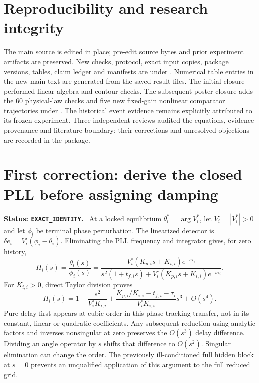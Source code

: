 \documentclass[11pt]{article}
\newcommand{\status}[1]{\par\smallskip\noindent\textbf{Status: \texttt{#1}.}\ }
\begin{document}
\section*{Reproducibility and research integrity}
The main source is edited in place; pre-edit source bytes and prior
experiment artifacts are preserved. New checks, protocol, exact
input copies, package versions, tables, claim ledger and manifests
are under .
Numerical table entries in the new main text are generated from
the saved result files. The initial closure performed linear-algebra
and contour checks. The subsequent poster closure adds the 60 physical-law
checks and five new fixed-gain nonlinear comparator trajectories under
.
The historical event evidence remains explicitly attributed to its
frozen experiment. Three independent reviews audited the equations,
evidence provenance and literature boundary; their corrections and
unresolved objections are recorded in the package.

\clearpage
\appendix
\section{First correction: derive the closed PLL before assigning damping}
\status{EXACT\_IDENTITY}
At a locked equilibrium $\theta_i^*=\arg V_i^*$, let
$V_i^\circ=|V_i^*|>0$ and let $\phi_i$ be terminal phase perturbation.
The linearized detector is $\delta e_i=V_i^\circ(\phi_i-\theta_i)$.
Eliminating the PLL frequency and integrator gives, for zero history,
\begin{equation}
 H_i(s)=\frac{\theta_i(s)}{\phi_i(s)}
 =\frac{V_i^\circ(K_{p,i}s+K_{i,i})e^{-s\tau_i}}
 {s^2(1+t_{f,i}s)+V_i^\circ(K_{p,i}s+K_{i,i})e^{-s\tau_i}}. \label{eq:H}
\end{equation}
For $K_{i,i}>0$, direct Taylor division proves
\begin{equation}
 H_i(s)=1-\frac{s^2}{V_i^\circ K_{i,i}}
 +\frac{K_{p,i}/K_{i,i}-t_{f,i}-\tau_i}{V_i^\circ K_{i,i}}s^3+O(s^4).
 \label{eq:series}
\end{equation}
Pure delay first appears at cubic order in this phase-tracking transfer,
not in its constant, linear or quadratic coefficients.
Any subsequent reduction using analytic factors and inverses nonsingular
at zero preserves the $O(s^3)$ delay difference. Dividing an angle
operator by $s$ shifts that difference to $O(s^2)$.
Singular elimination can change the order. The previously ill-conditioned
full hidden block at $s=0$ prevents an unqualified application of this
argument to the full reduced grid.
\end{document}
